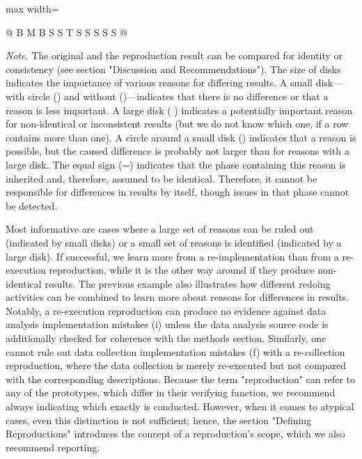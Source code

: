 \documentclass[authordate, meta]{jote-new-article}
\begin{document}
\begin{landscape}
\begin{table}
\begin{adjustbox}{max width=\linewidth}
\begin{tabularx}{\linewidth}{@{} B M B S S T S S S S S @{}}
\end{tabularx}
\end{adjustbox}
		\begin{minipage}{\linewidth}
		\emph{Note}. The original and the reproduction result can be compared for identity or consistency (see section "Discussion and Recommendations"). The size of disks indicates the importance of various reasons for differing results. A small disk---with circle () and without (\bullet)---indicates that there is no difference or that a reason is less important. A large disk ( \faCircle) indicates a potentially important reason for non-identical or inconsistent results (but we do not know which one, if a row contains more than one). A circle around a small disk () indicates that a reason is possible, but the caused difference is probably not larger than for reasons with a large disk. The equal sign (=) indicates that the phase containing this reason is inherited and, therefore, assumed to be identical. Therefore, it cannot be responsible for differences in results by itself, though issues in that phase cannot be detected.
		\end{minipage}
	\end{table}
\end{landscape}


	Most informative are cases where a large set of reasons can be ruled out (indicated by small disks) or a small set of reasons is identified (indicated by a large disk). If successful, we learn more from a re-implementation than from a re-execution reproduction, while it is the other way around if they produce non-identical results. The previous example also illustrates how different redoing activities can be combined to learn more about reasons for differences in results. Notably, a re-execution reproduction can produce no evidence against data analysis implementation mistakes (i) unless the data analysis source code is additionally checked for coherence with the methods section. Similarly, one cannot rule out data collection implementation mistakes (f) with a re-collection reproduction, where the data collection is merely re-executed but not compared with the corresponding descriptions. Because the term "reproduction" can refer to any of the prototypes, which differ in their verifying function, we recommend always indicating which exactly is conducted. However, when it comes to atypical cases, even this distinction is not sufficient; hence, the section "Defining Reproductions" introduces the concept of a reproduction's scope, which we also recommend reporting.
\end{document}
